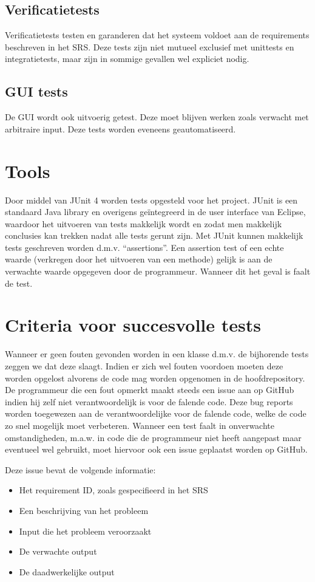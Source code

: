 \subsection{Verificatietests}
Verificatietests testen en garanderen dat het systeem voldoet aan de requirements beschreven in het SRS\cite{srs}. 
Deze tests zijn niet mutueel exclusief met unittests en integratietests, maar zijn in sommige gevallen wel expliciet nodig.

\subsection{GUI tests}
De GUI wordt ook uitvoerig getest. Deze moet blijven werken zoals verwacht met arbitraire input. Deze tests worden eveneens geautomatiseerd.

\section{Tools}
Door middel van JUnit 4\cite{junit} worden tests opgesteld voor het project. 
JUnit is een standaard Java library en overigens geïntegreerd in de user interface van Eclipse, waardoor het uitvoeren van tests makkelijk wordt en zodat men makkelijk conclusies kan trekken nadat alle tests gerunt zijn. 
Met JUnit kunnen makkelijk tests geschreven worden d.m.v. ``assertions''. 
Een assertion test of een echte waarde (verkregen door het uitvoeren van een methode) gelijk is aan de verwachte waarde opgegeven door de programmeur. Wanneer dit het geval is faalt de test. 	

\section{Criteria voor succesvolle tests}
Wanneer er geen fouten gevonden worden in een klasse d.m.v. de bijhorende tests zeggen we dat deze slaagt. 
Indien er zich wel fouten voordoen moeten deze worden opgelost alvorens de code mag worden opgenomen in de hoofdrepository.
De programmeur die een fout opmerkt maakt steeds een issue aan op GitHub indien hij zelf niet verantwoordelijk is voor de falende code.
Deze bug reports worden toegewezen aan de verantwoordelijke voor de falende code, welke de code zo snel mogelijk moet verbeteren. 
Wanneer een test faalt in onverwachte omstandigheden, m.a.w. in code die de programmeur niet heeft aangepast maar eventueel wel gebruikt, moet hiervoor ook een issue geplaatst worden op GitHub.

\noindent
Deze issue bevat de volgende informatie:
\begin{itemize}
	\item Het requirement ID, zoals gespecifieerd in het SRS\cite{srs}
	\item Een beschrijving van het probleem
	\item Input die het probleem veroorzaakt
	\item De verwachte output
	\item De daadwerkelijke output
\end{itemize}


